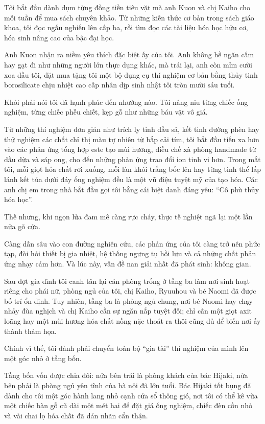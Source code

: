\documentclass[../main.tex]{subfiles}
\begin{document}
Tôi bắt đầu dành dụm từng đồng tiền tiêu vặt mà anh Kuon và chị Kaiho cho mỗi tuần để mua sách chuyên khảo. Từ những kiến thức cơ bản trong sách giáo khoa, tôi đọc ngấu nghiến lên cấp ba, rồi tìm đọc các tài liệu hóa học hữu cơ, hóa sinh nâng cao của bậc đại học.

Anh Kuon nhận ra niềm yêu thích đặc biệt ấy của tôi. Anh không hề ngăn cấm hay gạt đi như những người lớn thực dụng khác, mà trái lại, anh còn mỉm cười xoa đầu tôi, đặt mua tặng tôi một bộ dụng cụ thí nghiệm cơ bản bằng thủy tinh borosilicate chịu nhiệt cao cấp nhân dịp sinh nhật tôi tròn mười sáu tuổi.

Khỏi phải nói tôi đã hạnh phúc đến nhường nào. Tôi nâng niu từng chiếc ống nghiệm, từng chiếc phễu chiết, kẹp gỗ như những báu vật vô giá.

Từ những thí nghiệm đơn giản như trích ly tinh dầu sả, kết tinh đường phèn hay thử nghiệm các chất chỉ thị màu tự nhiên từ bắp cải tím, tôi bắt đầu tiến xa hơn vào các phản ứng tổng hợp este tạo mùi hương, điều chế xà phòng handmade từ dầu dừa và sáp ong, cho đến những phản ứng trao đổi ion tinh vi hơn. Trong mắt tôi, mỗi giọt hóa chất rơi xuống, mỗi làn khói trắng bốc lên hay từng tinh thể lấp lánh kết tủa dưới đáy ống nghiệm đều là một vũ điệu tuyệt mỹ của tạo hóa. Các anh chị em trong nhà bắt đầu gọi tôi bằng cái biệt danh đáng yêu: ``Cô phù thủy hóa học''.

\ct

Thế nhưng, khi ngọn lửa đam mê càng rực cháy, thực tế nghiệt ngã lại một lần nữa gõ cửa.

Càng dấn sâu vào con đường nghiên cứu, các phản ứng của tôi càng trở nên phức tạp, đòi hỏi thiết bị gia nhiệt, hệ thống ngưng tụ hồi lưu và cả những chất phản ứng nhạy cảm hơn. Và lúc này, vấn đề nan giải nhất đã phát sinh: không gian.

Sau đợt gia đình tôi canh tân lại căn phòng trống ở tầng ba làm nơi sinh hoạt riêng cho phái nữ, phòng ngủ của tôi, chị Kaiho, Ryuuhou và bé Naomi đã được bố trí ổn định. Tuy nhiên, tầng ba là phòng ngủ chung, nơi bé Naomi hay chạy nhảy đùa nghịch và chị Kaiho cần sự ngăn nắp tuyệt đối; chỉ cần một giọt axit loãng hay một mùi hương hóa chất nồng nặc thoát ra thôi cũng đủ để biến nơi ấy thành thảm họa.

Chính vì thế, tôi đành phải chuyển toàn bộ ``gia tài'' thí nghiệm của mình lên một góc nhỏ ở tầng bốn.

Tầng bốn vốn được chia đôi: nửa bên trái là phòng khách của bác Hijaki, nửa bên phải là phòng ngủ yên tĩnh của bà nội đã lớn tuổi. Bác Hijaki tốt bụng đã dành cho tôi một góc hành lang nhỏ cạnh cửa sổ thông gió, nơi tôi có thể kê vừa một chiếc bàn gỗ cũ dài một mét hai để đặt giá ống nghiệm, chiếc đèn cồn nhỏ và vài chai lọ hóa chất đã dán nhãn cẩn thận.
\end{document}
